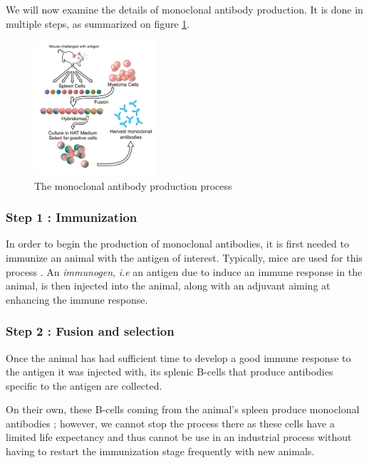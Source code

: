 We will now examine the details of monoclonal antibody production.
It is done in multiple steps, as summarized on figure \ref{fig:Monoclonal_Antibody_Production}.

\begin{figure}[H]
    \begin{center}
        \includegraphics[width=0.4\textwidth]{../Images/mab_hybridomas.png}
        \caption{The monoclonal antibody production process}
        \label{fig:Monoclonal_Antibody_Production}
    \end{center}
\end{figure}


\subsubsection{Step 1 : Immunization}

In order to begin the production of monoclonal antibodies, it is first
needed to immunize an animal with the antigen of interest. Typically, 
mice are used for this process \cite{leenaars_critical_2005}. 
An \emph{immunogen}, \textit{i.e} an antigen due to induce an immune response
in the animal, is then injected into the animal, along with an adjuvant
aiming at enhancing the immune response.


\subsubsection{Step 2 : Fusion and selection}

Once the animal has had sufficient time to develop a good immune
response to the antigen it was injected with, its splenic B-cells
that produce antibodies specific to the antigen are collected.

On their own, these B-cells coming from the animal's spleen produce
monoclonal antibodies ; however, we cannot stop the process there
as these cells have a limited life expectancy and thus cannot be
use in an industrial process without having to restart the immunization
stage frequently with new animals.

